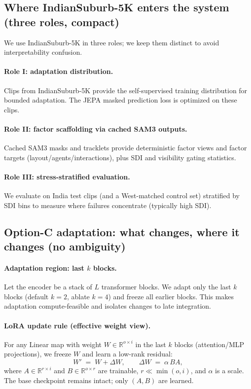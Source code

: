 \subsection{Where IndianSuburb-5K enters the system (three roles, compact)}
\label{sec:india_roles_compact}

We use IndianSuburb-5K in three roles; we keep them distinct to avoid interpretability confusion.

\paragraph{Role I: adaptation distribution.}
Clips from IndianSuburb-5K provide the self-supervised training distribution for bounded adaptation. The JEPA masked prediction loss is optimized on these clips.

\paragraph{Role II: factor scaffolding via cached SAM3 outputs.}
Cached SAM3 masks and tracklets provide deterministic factor views and factor targets (layout/agents/interactions), plus SDI and visibility gating statistics.

\paragraph{Role III: stress-stratified evaluation.}
We evaluate on India test clips (and a West-matched control set) stratified by SDI bins to measure where failures concentrate (typically high SDI).

\subsection{Option-C adaptation: what changes, where it changes (no ambiguity)}
\label{sec:option_c_what_changes}

\paragraph{Adaptation region: last $k$ blocks.}
Let the encoder be a stack of $L$ transformer blocks. We adapt only the last $k$ blocks (default $k=2$, ablate $k=4$) and freeze all earlier blocks. This makes adaptation compute-feasible and isolates changes to late integration.

\paragraph{LoRA update rule (effective weight view).}
For any Linear map with weight $W\in\mathbb{R}^{o\times i}$ in the last $k$ blocks (attention/MLP projections), we freeze $W$ and learn a low-rank residual:
\[
W' \;=\; W + \Delta W,
\qquad
\Delta W \;=\; \alpha\, B A,
\]
where $A\in\mathbb{R}^{r\times i}$ and $B\in\mathbb{R}^{o\times r}$ are trainable, $r\ll\min(o,i)$, and $\alpha$ is a scale. The base checkpoint remains intact; only $(A,B)$ are learned.

